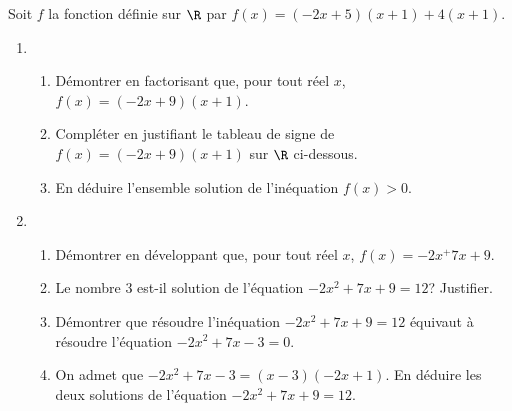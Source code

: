 \documentclass[a4paper]{article}
\begin{document}
  \medskip
  
  \begin{exercice}{}{}
  Soit $f$ la fonction définie sur $\R$ par $f(x)=(-2x+5)(x+1)+4(x+1)$.
  \begin{enumerate}
    \item \begin{enumerate}
      \item Démontrer en factorisant que, pour tout réel $x$, $f(x)=(-2x+9)(x+1)$.
      \item Compléter en justifiant le tableau de signe de $f(x)=(-2x+9)(x+1)$ sur $\R$ ci-dessous.
      \begin{center}
          \end{center}
      \item En déduire l'ensemble solution de l'inéquation $f(x)>0$.
    \end{enumerate}
    \item \begin{enumerate}
      \item Démontrer en développant que, pour tout réel $x$, $f(x)=-2x^+7x+9$.
      \item Le nombre $3$ est-il solution de l'équation $-2x^2+7x+9=12$? Justifier.
      \item Démontrer que résoudre l'inéquation $-2x^2+7x+9=12$ équivaut à résoudre l'équation $-2x^2+7x-3=0$.
      \item On admet que $-2x^2+7x-3=(x-3)(-2x+1)$. En déduire les deux solutions de l'équation $-2x^2+7x+9=12$.
    \end{enumerate}
  \end{enumerate}
  \end{exercice}
  
  \medskip
  
\end{document}
